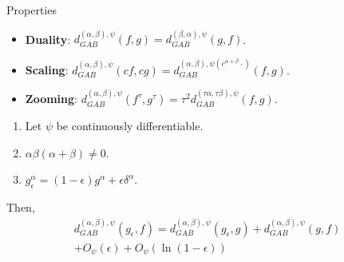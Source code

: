 \documentclass[10pt]{beamer}
\begin{document}
\begin{frame}{Properties}

    \begin{itemize}
        \item \textbf{Duality}: $d_{GAB}^{(\alpha,\beta),\psi}(f, g) = d_{GAB}^{(\beta,\alpha),\psi}(g, f)$.
        \item \textbf{Scaling}: $d_{GAB}^{(\alpha,\beta),\psi}(cf, cg) = d_{GAB}^{(\alpha,\beta), \psi(c^{\alpha+\beta} \cdot)}(f, g)$.
        \item \textbf{Zooming}: $d_{GAB}^{(\alpha,\beta),\psi}(f^\tau, g^\tau) = \tau^2 d_{GAB}^{(\tau\alpha,\tau\beta),\psi}(f, g)$.
    \end{itemize}

    \pause

    \begin{theorem}
        \begin{enumerate}
            \item Let $\psi$ be continuously differentiable.
            \item $\alpha\beta(\alpha+\beta) \neq 0$.
            \item $g_\epsilon^\alpha = (1-\epsilon)g^\alpha + \epsilon \delta^\alpha$.
        \end{enumerate}
        Then, 
        \begin{multline*}
            d_{GAB}^{(\alpha,\beta),\psi}(g_\epsilon, f)
            = d_{GAB}^{(\alpha,\beta),\psi}(g_\epsilon, g) 
            + d_{GAB}^{(\alpha,\beta),\psi}(g, f) 
            \\
            + O_{\psi}\left( \epsilon \right) + O_{\psi}\left( \ln(1-\epsilon) \right)
        \end{multline*}
    \end{theorem} 
\end{frame}
\end{document}
